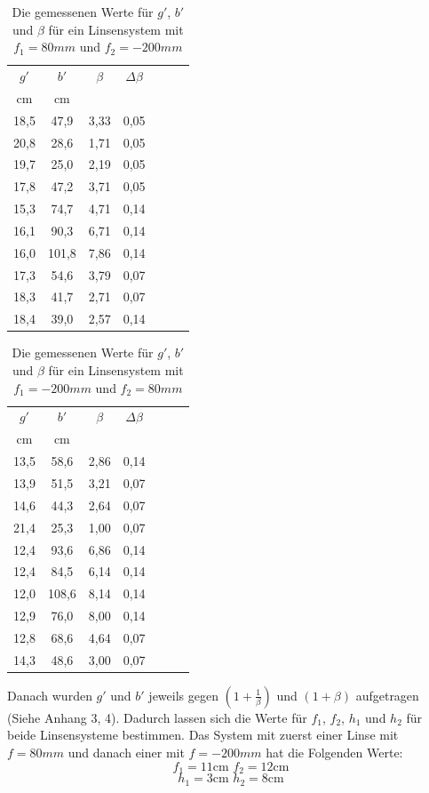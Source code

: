 \documentclass[11pt,a4paper]{article}
\begin{document}
\begin{table}[h]
	\centering
	\begin{tabular*}{0.50\textwidth}{@{\extracolsep{\fill}}cc|ccccc}
		\toprule
		$g'$ & $b'$ & $\beta$ & $\Delta \beta$   \\
		cm & cm& &\\
		18,5&47,9&3,33&0,05\\
		20,8&28,6&1,71&0,05\\
		19,7&25,0&2,19&0,05\\
		17,8&47,2&3,71&0,05\\
		15,3&74,7&4,71&0,14\\
		16,1&90,3&6,71&0,14\\
		16,0&101,8&7,86&0,14\\
		17,3&54,6&3,79&0,07\\
		18,3&41,7&2,71&0,07\\
		18,4&39,0&2,57&0,14\\
		\bottomrule
	\end{tabular*}
	\caption{Die gemessenen Werte für $g'$, $b'$ und $\beta$ für ein Linsensystem mit $f_1 = 80mm$ und $f_2 = -200mm$}
\end{table}



\begin{table}[h]
	\centering
	\begin{tabular*}{0.50\textwidth}{@{\extracolsep{\fill}}cc|ccccc}
		\toprule
		$g'$ & $b'$ & $\beta$ & $\Delta \beta$   \\
		cm & cm& &\\
		13,5&58,6&2,86&0,14\\
		13,9&51,5&3,21&0,07\\
		14,6&44,3&2,64&0,07\\
		21,4&25,3&1,00&0,07\\
		12,4&93,6&6,86&0,14\\
		12,4&84,5&6,14&0,14\\
		12,0&108,6&8,14&0,14\\
		12,9&76,0&8,00&0,14\\
		12,8&68,6&4,64&0,07\\
		14,3&48,6&3,00&0,07\\
		\bottomrule
	\end{tabular*}
	\caption{Die gemessenen Werte für $g'$, $b'$ und $\beta$ für ein Linsensystem mit $f_1 = -200mm$ und $f_2 = 80mm$}
\end{table}

\FloatBarrier
Danach wurden $g'$ und $b'$ jeweils gegen $(1+\frac{1}{\beta})$ und $(1+\beta)$ aufgetragen (Siehe Anhang 3, 4). 
Dadurch lassen sich die Werte für $f_1$, $f_2$, $h_1$ und $h_2$ für beide Linsensysteme bestimmen. 
Das System mit zuerst einer Linse mit $f=80mm$ und danach einer mit $f=-200mm$ hat die Folgenden Werte:
$$f_1 = 11\textrm{cm    } f_2 = 12\textrm{cm}$$
$$ h_1 = 3\textrm{cm    } h_2 = 8 \textrm{cm}$$
\end{document}
